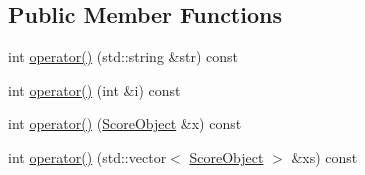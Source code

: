 \subsection*{Public Member Functions}
\begin{DoxyCompactItemize}
\item 
int \hyperlink{classget_int_arg_a17317c109e19e8cb19a1cbb9686a39c3}{operator()} (std\-::string \&str) const 
\item 
int \hyperlink{classget_int_arg_ab9f67ca57c8172ee815014ce60b11798}{operator()} (int \&i) const 
\item 
int \hyperlink{classget_int_arg_ab24e7454d1a4e8de20041da5982c8683}{operator()} (\hyperlink{class_score_object}{Score\-Object} \&x) const 
\item 
int \hyperlink{classget_int_arg_a3735f850f683ad933beeeea562fafc8a}{operator()} (std\-::vector$<$ \hyperlink{class_score_object}{Score\-Object} $>$ \&xs) const 
\end{DoxyCompactItemize}


